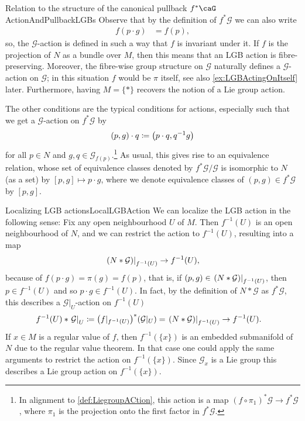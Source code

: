 \documentclass[reqno,a4paper,oneside]{amsart}
\theoremstyle{plain}
\theoremstyle{remark}
\theoremstyle{definition}
\begin{document}
\begin{remarks}{Relation to the structure of the canonical pullback $f^*\caG$}{ActionAndPullbackLGBs}
Observe that by the definition of $f^*\mathcal{G}$ we can also write
\begin{align*}
f(p \cdot g) &= f(p),
\end{align*}
so, the $\mathcal{G}$-action is defined in such a way that $f$ is invariant under it. If $f$ is the projection of $N$ as a bundle over $M$, then this means that an LGB action is fibre-preserving. Moreover, the fibre-wise group structure on $\mathcal{G}$ naturally defines a $\mathcal{G}$-action on $\mathcal{G}$; in this situation $f$ would be $\pi$ itself, see also \ref{ex:LGBActingOnItself} later. Furthermore, having $M = \{*\}$ recovers the notion of a Lie group action.
\newline

The other conditions are the typical conditions for actions, especially such that we get a $\mathcal{G}$-action on $f^*\mathcal{G}$ by
\begin{equation*}
(p, g) \cdot q
\coloneqq
\mleft( p \cdot q, q^{-1} g \mright)
\end{equation*}
for all $p \in N$ and $g, q \in \mathcal{G}_{f(p)}$.\footnote{In alignment to \ref{def:LiegroupACtion}, this action is a map $(f \circ \pi_1)^*\mathcal{G} \to f^*\mathcal{G}$, where $\pi_1$ is the projection onto the first factor in $f^*\mathcal{G}$.}
As usual, this gives rise to an equivalence relation, whose set of equivalence classes denoted by $f^*\mathcal{G} \Big/ \mathcal{G}$ is isomorphic to $N$ (as a set) by $[p, g] \mapsto p \cdot g$, where we denote equivalence classes of $(p, g) \in f^*\mathcal{G}$ by $[p, g]$.
\end{remarks}

\begin{remarks}{Localizing LGB actions}{LocalLGBAction}
We can localize the LGB action in the following sense: Fix any open neighbourhood $U$ of $M$. Then $f^{-1}(U)$ is an open neighbourhood of $N$, and we can restrict the action to $f^{-1}(U)$, resulting into a map
\begin{align*}
\mleft.(N*\mathcal{G})\mright|_{f^{-1}(U)} \to f^{-1}(U),
\end{align*}
because of $f(p \cdot g) = \pi(g) = f(p)$, that is, if $(p, g) \in \mleft.(N*\mathcal{G})\mright|_{f^{-1}(U)}$, then $p \in f^{-1}(U)$ and so $p \cdot g \in f^{-1}(U)$. In fact, by the definition of $N*\mathcal{G}$ as $f^*\mathcal{G}$, this describes a $\mathcal{G}|_{U}$-action on $f^{-1}(U)$
\begin{align*}
f^{-1}(U) * \mleft.\mathcal{G}\mright|_{U} \coloneqq \mleft( f|_{f^{-1}(U)}\mright)^*(\mathcal{G}|_U) = \mleft.(N*\mathcal{G})\mright|_{f^{-1}(U)} &\to f^{-1}(U).
\end{align*}
If $x \in M$ is a regular value of $f$, then $f^{-1}(\{x\})$ is an embedded submanifold of $N$ due to the regular value theorem. In that case one could apply the same arguments to restrict the action on $f^{-1}(\{x\})$. Since $\mathcal{G}_x$ is a Lie group this describes a Lie group action on $f^{-1}(\{x\})$.
\end{remarks}
\end{document}
